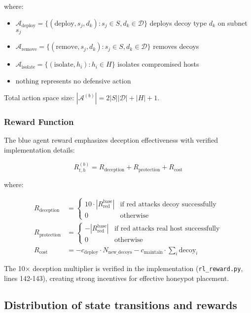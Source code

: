 \documentclass[11pt]{article}
\theoremstyle{definition}
\theoremstyle{plain}
\newcommand{\MC}[1]{\mathcal{#1}}
\begin{document}
where:
\begin{itemize}
    \item $\MC{A}_{\text{deploy}} = \{(\text{deploy}, s_j, d_k) : s_j \in S, d_k \in \MC{D}\}$ deploys decoy type $d_k$ on subnet $s_j$
    \item $\MC{A}_{\text{remove}} = \{(\text{remove}, s_j, d_k) : s_j \in S, d_k \in \MC{D}\}$ removes decoys
    \item $\MC{A}_{\text{isolate}} = \{(\text{isolate}, h_i) : h_i \in H\}$ isolates compromised hosts
    \item $\text{nothing}$ represents no defensive action
\end{itemize}

Total action space size: $|\MC{A}^{(b)}| = 2|S||\MC{D}| + |H| + 1$.

\subsubsection{Reward Function}
The blue agent reward emphasizes deception effectiveness with verified implementation details:

\begin{equation}
R_{t,h}^{(b)} = R_{\text{deception}} + R_{\text{protection}} + R_{\text{cost}}
\end{equation}

where:

\begin{align}
R_{\text{deception}} &= \begin{cases}
10 \cdot |R_{\text{red}}^{\text{base}}| & \text{if red attacks decoy successfully} \\
0 & \text{otherwise}
\end{cases} \\
R_{\text{protection}} &= \begin{cases}
-|R_{\text{red}}^{\text{base}}| & \text{if red attacks real host successfully} \\
0 & \text{otherwise}
\end{cases} \\
R_{\text{cost}} &= -c_{\text{deploy}} \cdot N_{\text{new\_decoys}} - c_{\text{maintain}} \cdot \sum_{i} \text{decoy}_i
\end{align}

The 10× deception multiplier is verified in the implementation (\texttt{rl\_reward.py}, lines 142-143), creating strong incentives for effective honeypot placement.

\subsection{Distribution of state transitions and rewards}
\end{document}
